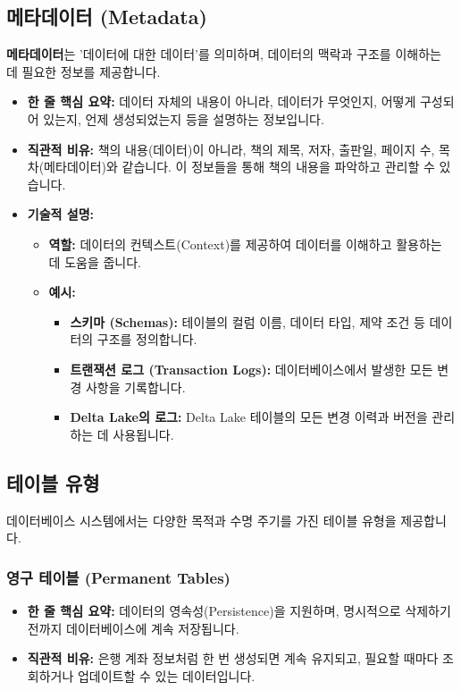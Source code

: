 \documentclass[11pt,a4paper]{article}
\theoremstyle{definition}
\begin{document}
\subsection{메타데이터 (Metadata)}

\begin{conceptbox}
\textbf{메타데이터}는 '데이터에 대한 데이터'를 의미하며, 데이터의 맥락과 구조를 이해하는 데 필요한 정보를 제공합니다.
\end{conceptbox}

\begin{itemize}
    \item \textbf{한 줄 핵심 요약:} 데이터 자체의 내용이 아니라, 데이터가 무엇인지, 어떻게 구성되어 있는지, 언제 생성되었는지 등을 설명하는 정보입니다.
    \item \textbf{직관적 비유:} 책의 내용(데이터)이 아니라, 책의 제목, 저자, 출판일, 페이지 수, 목차(메타데이터)와 같습니다. 이 정보들을 통해 책의 내용을 파악하고 관리할 수 있습니다.
    \item \textbf{기술적 설명:}
    \begin{itemize}
        \item \textbf{역할:} 데이터의 컨텍스트(Context)를 제공하여 데이터를 이해하고 활용하는 데 도움을 줍니다.
        \item \textbf{예시:}
        \begin{itemize}
            \item \textbf{스키마 (Schemas):} 테이블의 컬럼 이름, 데이터 타입, 제약 조건 등 데이터의 구조를 정의합니다.
            \item \textbf{트랜잭션 로그 (Transaction Logs):} 데이터베이스에서 발생한 모든 변경 사항을 기록합니다.
            \item \textbf{Delta Lake의 로그:} Delta Lake 테이블의 모든 변경 이력과 버전을 관리하는 데 사용됩니다.
        \end{itemize}
    \end{itemize}
\end{itemize}

\subsection{테이블 유형}

데이터베이스 시스템에서는 다양한 목적과 수명 주기를 가진 테이블 유형을 제공합니다.

\subsubsection{영구 테이블 (Permanent Tables)}
\begin{itemize}
    \item \textbf{한 줄 핵심 요약:} 데이터의 영속성(Persistence)을 지원하며, 명시적으로 삭제하기 전까지 데이터베이스에 계속 저장됩니다.
    \item \textbf{직관적 비유:} 은행 계좌 정보처럼 한 번 생성되면 계속 유지되고, 필요할 때마다 조회하거나 업데이트할 수 있는 데이터입니다.
\end{itemize}
\end{document}
